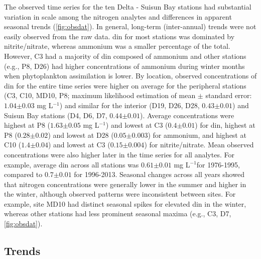 \documentclass[journal = esthag, manuscript = article]{achemso}\usepackage[]{graphicx}\usepackage[]{color}
\newcommand{\mgl}{mg L$^{-1}$}
\begin{document}
The observed time series for the ten Delta - Suisun Bay stations had substantial variation in scale among the nitrogen analytes and differences in apparent seasonal trends (\cref{fig:obsdat}).  In general, long-term (inter-annual) trends were not easily observed from the raw data. \ac{din} for most stations was dominated by nitrite/nitrate, whereas ammonium was a smaller percentage of the total.  However, C3 had a majority of \ac{din} composed of ammonium and other stations (e.g., P8, D26) had higher concentrations of ammonium during winter months when phytoplankton assimilation is lower\cite{Novick15}.  By location, observed concentrations of \ac{din} for the entire time series were higher on average for the peripheral stations (C3, C10, MD10, P8; maximum likelihood estimation of mean $\pm$ standard error: $1.04$$\pm$$0.03$ \mgl) and similar for the interior (D19, D26, D28, $0.43$$\pm$$0.01$) and Suisun Bay stations (D4, D6, D7, $0.44$$\pm$$0.01$).  Average concentrations were highest at P8 ($1.63$$\pm$$0.05$ \mgl) and lowest at C3 ($0.4$$\pm$$0.01$) for \ac{din}, highest at P8 ($0.28$$\pm$$0.02$) and lowest at D28 ($0.05$$\pm$$0.003$) for ammonium, and highest at C10 ($1.4$$\pm$$0.04$) and lowest at C3 ($0.15$$\pm$$0.004$) for nitrite/nitrate. Mean observed concentrations were also higher later in the time series for all analytes.  For example, average \ac{din} across all stations was $0.61$$\pm$$0.01$ \mgl for 1976-1995, compared to $0.7$$\pm$$0.01$ for 1996-2013. Seasonal changes across all years showed that nitrogen concentrations were generally lower in the summer and higher in the winter, although observed patterns were inconsistent between sites.  For example, site MD10 had distinct seasonal spikes for elevated \ac{din} in the winter, whereas other stations had less prominent seasonal maxima (e.g., C3, D7, \cref{fig:obsdat}).  

\subsection{Trends}
\end{document}
